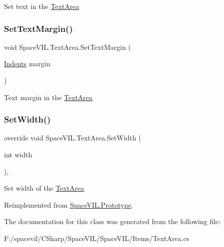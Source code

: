 Set text in the \mbox{\hyperlink{class_space_v_i_l_1_1_text_area}{Text\+Area}} 

\mbox{\label{class_space_v_i_l_1_1_text_area_a4c109ddb93c025558a90184754f59de8}} 
\subsubsection{\texorpdfstring{Set\+Text\+Margin()}{SetTextMargin()}}
{\footnotesize\ttfamily void Space\+V\+I\+L.\+Text\+Area.\+Set\+Text\+Margin (\begin{DoxyParamCaption}\item[{\mbox{\hyperlink{struct_space_v_i_l_1_1_decorations_1_1_indents}{Indents}}}]{margin }\end{DoxyParamCaption})\hspace{0.3cm}{\ttfamily [inline]}}



Text margin in the \mbox{\hyperlink{class_space_v_i_l_1_1_text_area}{Text\+Area}} 

\mbox{\label{class_space_v_i_l_1_1_text_area_a214e3d5afc4c12519fb8594dce699ef0}} 
\subsubsection{\texorpdfstring{Set\+Width()}{SetWidth()}}
{\footnotesize\ttfamily override void Space\+V\+I\+L.\+Text\+Area.\+Set\+Width (\begin{DoxyParamCaption}\item[{int}]{width }\end{DoxyParamCaption})\hspace{0.3cm}{\ttfamily [inline]}, {\ttfamily [virtual]}}



Set width of the \mbox{\hyperlink{class_space_v_i_l_1_1_text_area}{Text\+Area}} 



Reimplemented from \mbox{\hyperlink{class_space_v_i_l_1_1_prototype_a6a4f1b9581f4d18f1c3a3e287d4b2a2b}{Space\+V\+I\+L.\+Prototype}}.



The documentation for this class was generated from the following file\+:\begin{DoxyCompactItemize}
\item 
F\+:/spacevil/\+C\+Sharp/\+Space\+V\+I\+L/\+Space\+V\+I\+L/\+Items/Text\+Area.\+cs\end{DoxyCompactItemize}
